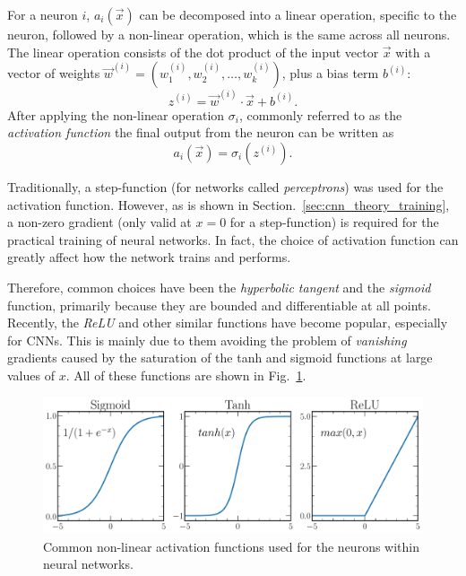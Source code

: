For a neuron $i$, $a_{i}(\vec{x})$ can be decomposed into a linear operation, specific to the
neuron, followed by a non-linear operation, which is the same across all neurons. The linear
operation consists of the dot product of the input vector $\vec{x}$ with a vector of weights
$\vec{w}^{(i)} = (w_{1}^{(i)}, w_{2}^{(i)},\dots,w_{k}^{(i)})$, plus a bias term $b^{(i)}$:
\begin{equation} %
    z^{(i)}=\vec{w}^{(i)}\cdot\vec{x}+b^{(i)}.
    \label{eq:network}
\end{equation}
After applying the non-linear operation $\sigma_{i}$, commonly referred to as the \emph{activation
    function} the final output from the neuron can be written as
\begin{equation} %
    a_{i}(\vec{x})=\sigma_{i}(z^{(i)}).
    \label{eq:activation}
\end{equation}

Traditionally, a step-function (for networks called \emph{perceptrons}) was used for the
activation function. However, as is shown in Section.~\ref{sec:cnn_theory_training}, a non-zero
gradient (only valid at $x=0$ for a step-function) is required for the practical training of
neural networks. In fact, the choice of activation function can greatly affect how the network
trains and performs.

Therefore, common choices have been the \emph{hyperbolic tangent} and the \emph{sigmoid} function,
primarily because they are bounded and differentiable at all points. Recently, the \emph{ReLU} and
other similar functions have become popular, especially for CNNs. This is mainly due to them
avoiding the problem of \emph{vanishing} gradients caused by the saturation of the tanh and
sigmoid functions at large values of $x$. All of these functions are shown in
Fig.~\ref{fig:activations}.

\begin{figure} %
    \includegraphics[width=\textwidth]{diagrams/6-cnn/activations.pdf}
    \caption[Common non-linear activation functions]
    {Common non-linear activation functions used for the neurons within neural networks.}
    \label{fig:activations}
\end{figure}


